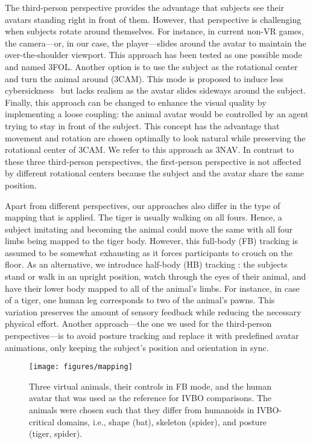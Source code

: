 \documentclass[conference]{IEEEtran}
\begin{document}
The third-person perspective provides the advantage that subjects see their avatars standing right in front of them. However, that perspective is challenging when subjects rotate around themselves. For instance, in current non-VR games, the camera---or, in our case, the player---slides around the avatar to maintain the over-the-shoulder viewport.  This approach has been tested as one possible mode and named 3FOL. Another option is to use the subject as the rotational center and turn the animal around (3CAM). This mode is proposed to induce less cybersickness~\cite{laviola2000discussion} but lacks realism as the avatar slides sideways around the subject. Finally, this approach can be changed to enhance the visual quality by implementing a loose coupling: the animal avatar would be controlled by an agent trying to stay in front of the subject. This concept has the advantage that movement and rotation are chosen optimally to look natural while preserving the rotational center of 3CAM. We refer to this approach as 3NAV. In contrast to these three third-person perspectives, the first-person perspective is not affected by different rotational centers because the subject and the avatar share the same position.


Apart from different perspectives, our approaches also differ in the type of mapping that is applied. The tiger is usually walking on all fours. Hence, a subject imitating and becoming the animal could move the same with all four limbs being mapped to the tiger body. However, this full-body (FB) tracking is assumed to be somewhat exhausting as it forces participants to crouch on the floor. As an alternative, we introduce half-body (HB) tracking : the subjects stand or walk in an upright position, watch through the eyes of their animal, and have their lower body mapped to all of the animal’s limbs. For instance, in case of a tiger, one human leg corresponds to two of the animal's pawns. This variation preserves the amount of sensory feedback while reducing the necessary physical effort. Another approach---the one we used for the third-person perspectives---is to avoid posture tracking and replace it with predefined avatar animations, only keeping the subject's position and orientation in sync.





\begin{figure*}[t!]
\centering
\texttt{[image: figures/mapping]}
\caption{Three virtual animals, their controls in FB mode, and the human avatar that was used as the reference for IVBO comparisons. The animals were chosen such that they differ from humanoids in IVBO-critical domains, i.e., shape (bat), skeleton (spider), and posture (tiger, spider).}
\label{fig:mapping}
\end{figure*}
\end{document}
